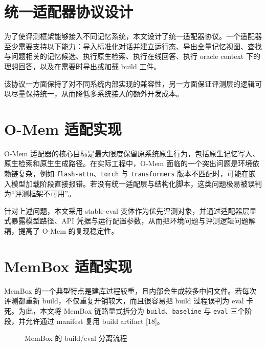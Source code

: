 \section{统一适配器协议设计}

为了使评测框架能够接入不同记忆系统，本文设计了统一适配器协议。一个适配器至少需要支持以下能力：导入标准化对话并建立运行态、导出全量记忆视图、查找与问题相关的记忆候选、执行原生检索、执行在线回答、执行 oracle context 下的理想回答，以及在需要时导出或加载 build 工件。

该协议一方面保持了对不同系统内部实现的兼容性，另一方面保证评测层的逻辑可以尽量保持统一，从而降低多系统接入的额外开发成本。

\section{O-Mem 适配实现}

O-Mem 适配器的核心目标是最大限度保留原系统原生行为，包括原生记忆写入、原生检索和原生生成路径。在实际工程中，O-Mem 面临的一个突出问题是环境依赖链复杂，例如 \texttt{flash-attn}、\texttt{torch} 与 \texttt{transformers} 版本不匹配时，可能在嵌入模型加载阶段直接报错。若没有统一适配层与结构化脚本，这类问题极易被误判为“评测框架不可用”。

针对上述问题，本文采用 stable-eval 变体作为优先评测对象，并通过适配器层显式暴露模型路径、API 凭据与运行配置参数，从而把环境问题与评测逻辑问题解耦，提高了 O-Mem 的复现稳定性。

\section{MemBox 适配实现}

MemBox 的一个典型特点是建库过程较重，且内部会生成较多中间文件。若每次评测都重新 build，不仅重复开销较大，而且很容易把 build 过程误判为 eval 卡死。为此，本文将 MemBox 链路显式拆分为 \texttt{build}、\texttt{baseline} 与 \texttt{eval} 三个阶段，并允许通过 manifest 复用 build artifact [18]。

\begin{figure}[htbp]
\centering
{}
\caption{MemBox 的 build/eval 分离流程}
\label{fig:membox-build}
\end{figure}

